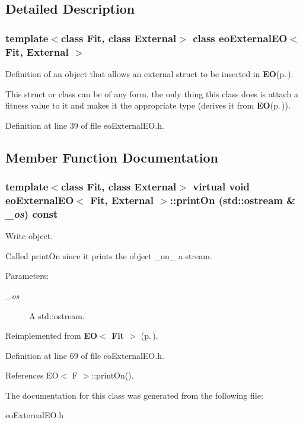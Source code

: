 \subsection{Detailed Description}
\subsubsection*{template$<$class Fit, class External$>$ class eo\-External\-EO$<$ Fit, External $>$}

Definition of an object that allows an external struct to be inserted in {\bf EO}{\rm (p.\,\pageref{class_e_o})}. 

This struct or class can be of any form, the only thing this class does is attach a fitness value to it and makes it the appropriate type (derives it from {\bf EO}{\rm (p.\,\pageref{class_e_o})}). 



Definition at line 39 of file eo\-External\-EO.h.

\subsection{Member Function Documentation}
\subsubsection{\setlength{\rightskip}{0pt plus 5cm}template$<$class Fit, class External$>$ virtual void {\bf eo\-External\-EO}$<$ Fit, External $>$::print\-On (std::ostream \& {\em \_\-os}) const\hspace{0.3cm}{\tt  [inline, virtual]}}\label{classeo_external_e_o_a4}


Write object. 

Called print\-On since it prints the object \_\-on\_\- a stream. \begin{Desc}
\item[Parameters:]
\begin{description}
\item[{\em \_\-os}]A std::ostream. \end{description}
\end{Desc}


Reimplemented from {\bf EO$<$ Fit $>$} {\rm (p.\,\pageref{class_e_o_z10_2})}.

Definition at line 69 of file eo\-External\-EO.h.

References EO$<$ F $>$::print\-On().

The documentation for this class was generated from the following file:\begin{CompactItemize}
\item 
eo\-External\-EO.h\end{CompactItemize}
